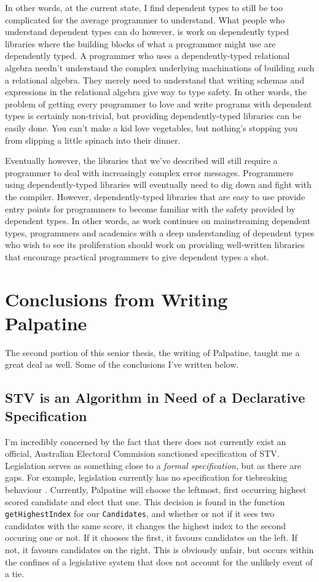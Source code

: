In other words, at the current state, I find dependent types to still be too
complicated for the average programmer to understand. What people who understand
dependent types can do however, is work on dependently typed libraries where the
building blocks of what a programmer might use are dependently typed. A
programmer who uses a dependently-typed relational algebra needn't understand
the complex underlying machinations of building such a relational algebra. They
merely need to understand that writing schemas and expressions in the relational
algebra give way to type safety. In other words, the problem of getting every
programmer to love and write programs with dependent types is certainly
non-trivial, but providing dependently-typed libraries can be easily done. You
can't make a kid love vegetables, but nothing's stopping you from slipping a
little spinach into their dinner. 

Eventually however, the libraries that we've described will still require a
programmer to deal with increasingly complex error messages. Programmers using
dependently-typed libraries will eventually need to dig down and fight with the
compiler. However, dependently-typed libraries that are easy to use provide
entry points for programmers to become familiar with the safety provided by
dependent types. In other words, as work continues on mainstreaming dependent
types, programmers and academics with a deep understanding of dependent types
who wish to see its proliferation should work on providing well-written
libraries that encourage practical programmers to give dependent types a shot.

\clearpage

\section{Conclusions from Writing Palpatine}

The second portion of this senior thesis, the writing of Palpatine,
taught me a great deal as well. Some of the conclusions I've written below. 

\subsection{STV is an Algorithm in Need of a Declarative Specification}

I'm incredibly concerned by the fact that there does not currently exist an
official, Australian Electoral Commision sanctioned specification of STV.
Legislation serves as something close to a \textit{formal specification}, but as
there are gaps. For example, legislation currently has no specification for
tiebreaking behaviour \cite{stv_haskell}. Currently, Palpatine will choose the
leftmost, first occurring highest scored candidate and elect that one. This
decision is found in the function \texttt{getHighestIndex} for our
\texttt{Candidates}, and whether or not if it sees two candidates with the same
score, it changes the highest index to the second occuring one or not. If it
chooses the first, it favours candidates on the left. If not, it favours
candidates on the right. This is obviously unfair, but occurs within the
confines of a legislative system that does not account for the unlikely event of
a tie. 

